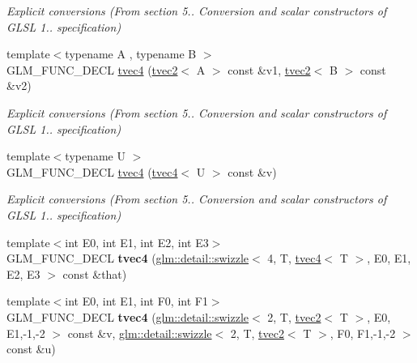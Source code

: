 \begin{DoxyCompactItemize}
\begin{DoxyCompactList}\small\item\em Explicit conversions (From section 5.. Conversion and scalar constructors of G\+L\+S\+L 1.. specification) \end{DoxyCompactList}\item 
\hypertarget{structglm_1_1detail_1_1tvec4_a286ff5e27147379cd4ba828e94715686}{}{\footnotesize template$<$typename A , typename B $>$ }\\G\+L\+M\+\_\+\+F\+U\+N\+C\+\_\+\+D\+E\+C\+L \hyperlink{structglm_1_1detail_1_1tvec4_a286ff5e27147379cd4ba828e94715686}{tvec4} (\hyperlink{structglm_1_1detail_1_1tvec2}{tvec2}$<$ A $>$ const \&v1, \hyperlink{structglm_1_1detail_1_1tvec2}{tvec2}$<$ B $>$ const \&v2)\label{structglm_1_1detail_1_1tvec4_a286ff5e27147379cd4ba828e94715686}

\begin{DoxyCompactList}\small\item\em Explicit conversions (From section 5.. Conversion and scalar constructors of G\+L\+S\+L 1.. specification) \end{DoxyCompactList}\item 
\hypertarget{structglm_1_1detail_1_1tvec4_aebce6283ba41010596bb01c785d43d97}{}{\footnotesize template$<$typename U $>$ }\\G\+L\+M\+\_\+\+F\+U\+N\+C\+\_\+\+D\+E\+C\+L \hyperlink{structglm_1_1detail_1_1tvec4_aebce6283ba41010596bb01c785d43d97}{tvec4} (\hyperlink{structglm_1_1detail_1_1tvec4}{tvec4}$<$ U $>$ const \&v)\label{structglm_1_1detail_1_1tvec4_aebce6283ba41010596bb01c785d43d97}

\begin{DoxyCompactList}\small\item\em Explicit conversions (From section 5.. Conversion and scalar constructors of G\+L\+S\+L 1.. specification) \end{DoxyCompactList}\item 
\hypertarget{structglm_1_1detail_1_1tvec4_ab6f537fb6207aaefb6dc098ad4b78e93}{}{\footnotesize template$<$int E0, int E1, int E2, int E3$>$ }\\G\+L\+M\+\_\+\+F\+U\+N\+C\+\_\+\+D\+E\+C\+L {\bfseries tvec4} (\hyperlink{structglm_1_1detail_1_1swizzle}{glm\+::detail\+::swizzle}$<$ 4, T, \hyperlink{structglm_1_1detail_1_1tvec4}{tvec4}$<$ T $>$, E0, E1, E2, E3 $>$ const \&that)\label{structglm_1_1detail_1_1tvec4_ab6f537fb6207aaefb6dc098ad4b78e93}

\item 
\hypertarget{structglm_1_1detail_1_1tvec4_adee18e0982dfe0d8fdf78ff81c25aae6}{}{\footnotesize template$<$int E0, int E1, int F0, int F1$>$ }\\G\+L\+M\+\_\+\+F\+U\+N\+C\+\_\+\+D\+E\+C\+L {\bfseries tvec4} (\hyperlink{structglm_1_1detail_1_1swizzle}{glm\+::detail\+::swizzle}$<$ 2, T, \hyperlink{structglm_1_1detail_1_1tvec2}{tvec2}$<$ T $>$, E0, E1,-\/1,-\/2 $>$ const \&v, \hyperlink{structglm_1_1detail_1_1swizzle}{glm\+::detail\+::swizzle}$<$ 2, T, \hyperlink{structglm_1_1detail_1_1tvec2}{tvec2}$<$ T $>$, F0, F1,-\/1,-\/2 $>$ const \&u)\label{structglm_1_1detail_1_1tvec4_adee18e0982dfe0d8fdf78ff81c25aae6}


\end{DoxyCompactItemize}
